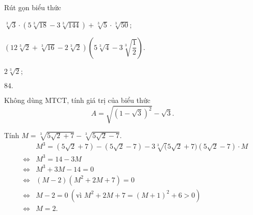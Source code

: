 \begin{bt}%
	Rút gọn biểu thức 
	\begin{listEX}[2]
	\item $\sqrt[3]{3}\cdot(5\sqrt[3]{18} - 3\sqrt[3]{144}) + \sqrt[3]{5}\cdot\sqrt[3]{50}$;
	\item $(12\sqrt[3]{2} + \sqrt[3]{16} - 2\sqrt[3]{2})\left(5\sqrt[3]{4} - 3\sqrt[3]{\dfrac{1}{2}}\right)$.
	\end{listEX}
	\loigiai
	{
	\begin{listEX}[2]
	\item $2\sqrt[3]{2}$;
	\item $84.$
	\end{listEX}
	}
\end{bt}

\begin{bt}
	Không dùng MTCT, tính giá trị của biểu thức
	$$A=\sqrt{(1-\sqrt{3})^2}-\sqrt{3}.$$
\end{bt}
\begin{bt}%
	Tính $M=\sqrt[3]{5\sqrt{2} + 7} - \sqrt[3]{5\sqrt{2} - 7}$.
	\loigiai
	{
	\allowdisplaybreaks 
	\begin{eqnarray*}
	&&M^3=(5\sqrt{2} + 7) - (5\sqrt{2} - 7) - 3\sqrt[3](5\sqrt{2} + 7)(5\sqrt{2} - 7) \cdot M\\
	&\Leftrightarrow& M^3=14 - 3 M\\
	&\Leftrightarrow& M^3 + 3 M - 14=0\\
	&\Leftrightarrow& \left( M - 2\right)\left( M^2 + 2M + 7\right)=0\\
	&\Leftrightarrow& M - 2=0~\left(\text{vì } M^2 + 2 M + 7=( M + 1)^2 + 6>0\right)\\
	&\Leftrightarrow& M=2.
	\end{eqnarray*}
	}
\end{bt}

